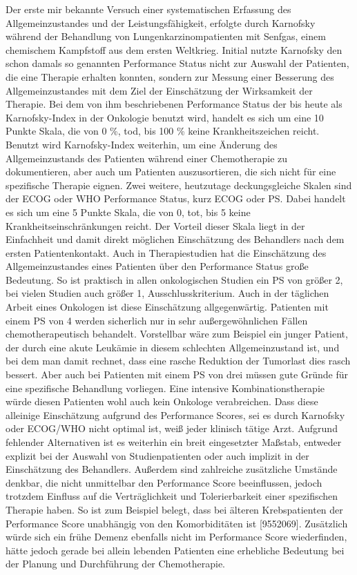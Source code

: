 Der erste mir bekannte Versuch einer systematischen Erfassung des
Allgemeinzustandes und der Leistungsfähigkeit, erfolgte durch
Karnofsky während der Behandlung von Lungenkarzinompatienten mit
Senfgas, einem chemischem Kampfstoff aus dem ersten Weltkrieg. Initial
nutzte Karnofsky den schon damals so genannten Performance Status
nicht zur Auswahl der Patienten, die eine Therapie erhalten konnten,
sondern zur Messung einer Besserung des Allgemeinzustandes mit dem
Ziel der Einschätzung der Wirksamkeit der Therapie. Bei dem von ihm
beschriebenen Performance Status der bis heute als Karnofsky-Index in
der Onkologie benutzt wird, handelt es sich um eine 10 Punkte Skala,
die von 0 \%, tod, bis 100 \% keine Krankheitszeichen reicht.
Benutzt wird Karnofsky-Index weiterhin, um eine Änderung des Allgemeinzustands des Patienten während einer Chemotherapie zu dokumentieren, aber auch um Patienten auszusortieren, die sich nicht für eine spezifische Therapie eignen.
Zwei weitere, heutzutage deckungsgleiche Skalen sind der ECOG oder WHO Performance Status, kurz ECOG oder PS. Dabei handelt es sich um eine 5 Punkte Skala, die von 0, tot, bis 5 keine Krankheitseinschränkungen reicht. Der Vorteil dieser Skala liegt in der Einfachheit und damit direkt möglichen Einschätzung des Behandlers nach dem ersten Patientenkontakt. Auch in Therapiestudien hat die Einschätzung des Allgemeinzustandes eines Patienten über den Performance Status große Bedeutung. So ist praktisch in allen onkologischen Studien ein PS von größer 2, bei vielen Studien auch größer 1, Ausschlusskriterium. Auch in der täglichen Arbeit eines Onkologen ist diese Einschätzung allgegenwärtig. Patienten mit einem PS von 4 werden sicherlich nur in sehr außergewöhnlichen Fällen chemotherapeutisch behandelt. Vorstellbar wäre zum Beispiel ein junger Patient, der durch eine akute Leukämie in diesem schlechten Allgemeinzustand ist, und bei dem man damit rechnet, dass eine rasche Reduktion der Tumorlast dies rasch bessert.
Aber auch bei Patienten mit einem PS von drei müssen gute Gründe für eine spezifische Behandlung vorliegen. Eine intensive Kombinationstherapie würde diesen Patienten wohl auch kein Onkologe verabreichen.
Dass diese alleinige Einschätzung aufgrund des Performance Scores, sei es durch Karnofsky oder ECOG/WHO nicht optimal ist, weiß jeder klinisch tätige Arzt. Aufgrund fehlender Alternativen ist es weiterhin ein breit eingesetzter Maßstab, entweder explizit bei der Auswahl von Studienpatienten oder auch implizit in der Einschätzung des Behandlers. 
Außerdem sind zahlreiche zusätzliche Umstände denkbar, die nicht unmittelbar den Performance Score beeinflussen, jedoch trotzdem Einfluss auf die Verträglichkeit und Tolerierbarkeit einer spezifischen Therapie haben. So ist zum Beispiel belegt, dass bei älteren Krebspatienten der Performance Score unabhängig von den Komorbiditäten ist [9552069].
Zusätzlich würde sich ein frühe Demenz ebenfalls nicht im Performance Score wiederfinden, hätte jedoch gerade bei allein lebenden Patienten eine erhebliche Bedeutung bei der Planung und Durchführung der Chemotherapie.

